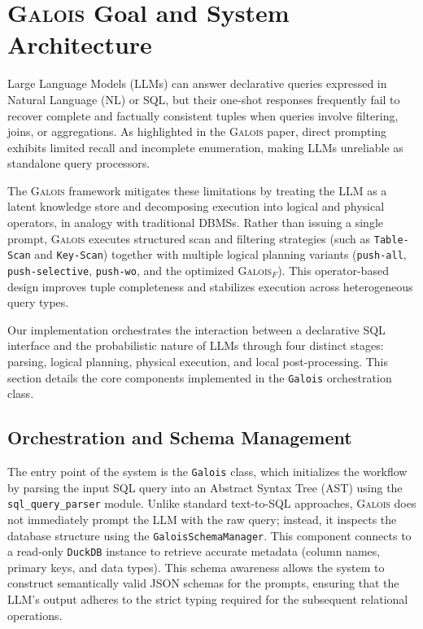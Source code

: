 \section{\textsc{Galois} Goal and System Architecture}

Large Language Models (LLMs) can answer declarative queries expressed in Natural Language (NL) or SQL, but their one-shot responses frequently fail to recover complete and factually consistent tuples when queries involve filtering, joins, or aggregations. As highlighted in the \textsc{Galois} paper, direct prompting exhibits limited recall and incomplete enumeration, making LLMs unreliable as standalone query processors.

The \textsc{Galois} framework mitigates these limitations by treating the LLM as a latent knowledge store and decomposing execution into logical and physical operators, in analogy with traditional DBMSs. Rather than issuing a single prompt, \textsc{Galois} executes structured scan and filtering strategies (such as \texttt{Table-Scan} and \texttt{Key-Scan}) together with multiple logical planning variants (\texttt{push-all}, \texttt{push-selective}, \texttt{push-wo}, and the optimized \textsc{Galois}$_{F}$). This operator-based design improves tuple completeness and stabilizes execution across heterogeneous query types.

Our implementation orchestrates the interaction between a declarative SQL interface and the probabilistic nature of LLMs through four distinct stages: parsing, logical planning, physical execution, and local post-processing. This section details the core components implemented in the \texttt{Galois} orchestration class.

\subsection{Orchestration and Schema Management}

The entry point of the system is the \texttt{Galois} class, which initializes the workflow by parsing the input SQL query into an Abstract Syntax Tree (AST) using the \texttt{sql\_query\_parser} module. Unlike standard text-to-SQL approaches, \textsc{Galois} does not immediately prompt the LLM with the raw query; instead, it inspects the database structure using the \texttt{GaloisSchemaManager}. This component connects to a read-only \texttt{DuckDB} instance to retrieve accurate metadata (column names, primary keys, and data types). This schema awareness allows the system to construct semantically valid JSON schemas for the prompts, ensuring that the LLM's output adheres to the strict typing required for the subsequent relational operations.

